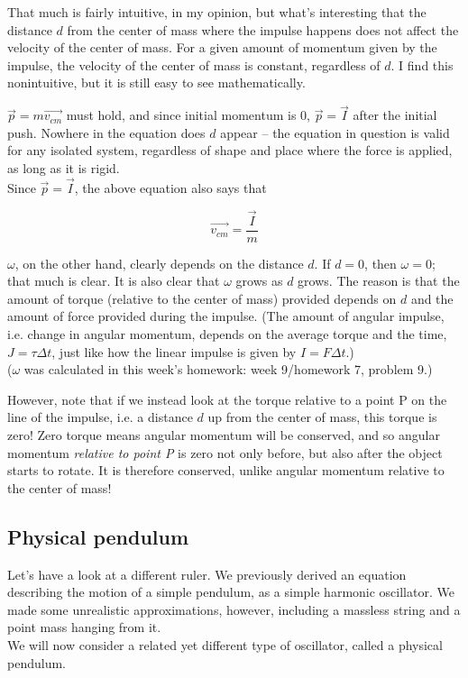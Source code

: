 That much is fairly intuitive, in my opinion, but what's interesting that the distance $d$ from the center of mass where the impulse happens does not affect the velocity of the center of mass. For a given amount of momentum given by the impulse, the velocity of the center of mass is constant, regardless of $d$. I find this nonintuitive, but it is still easy to see mathematically.

$\vec{p} = m \vec{v_{cm}}$ must hold, and since initial momentum is 0, $\vec{p} = \vec{I}$ after the initial push. Nowhere in the equation does $d$ appear -- the equation in question is valid for any isolated system, regardless of shape and place where the force is applied, as long as it is rigid.\\
Since $\vec{p} = \vec{I}$, the above equation also says that

\begin{equation}
\vec{v_{cm}} = \frac{\vec{I}}{m}
\end{equation}

$\omega$, on the other hand, clearly depends on the distance $d$. If $d = 0$, then $\omega = 0$; that much is clear. It is also clear that $\omega$ grows as $d$ grows. The reason is that the amount of torque (relative to the center of mass) provided depends on $d$ and the amount of force provided during the impulse. (The amount of angular impulse, i.e. change in angular momentum, depends on the average torque and the time, $J = \tau \Delta t$, just like how the linear impulse is given by $I = F \Delta t$.)\\
($\omega$ was calculated in this week's homework: week 9/homework 7, problem 9.)

However, note that if we instead look at the torque relative to a point P on the line of the impulse, i.e. a distance $d$ up from the center of mass, this torque is zero! Zero torque means angular momentum will be conserved, and so angular momentum \emph{relative to point P} is zero not only before, but also after the object starts to rotate. It is therefore conserved, unlike angular momentum relative to the center of mass!

\subsection{Physical pendulum}

Let's have a look at a different ruler. We previously derived an equation describing the motion of a simple pendulum, as a simple harmonic oscillator. We made some unrealistic approximations, however, including a massless string and a point mass hanging from it.\\
We will now consider a related yet different type of oscillator, called a physical pendulum.

